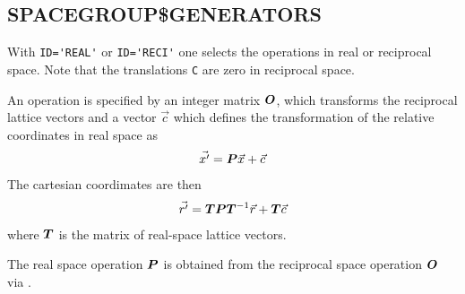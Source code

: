 \documentclass[11pt,a4paper]{report}
\begin{document}
\subsection{SPACEGROUP\$GENERATORS}
With \verb|ID='REAL'| or \verb|ID='RECI'| one selects the operations
in real or reciprocal space. Note that the translations \verb|C| are
zero in reciprocal space.

An operation is specified by an integer matrix $\bm{O}$, which
transforms the reciprocal lattice vectors and a vector $\vec{c}$ which
defines the transformation of the relative coordinates in real space
as
\begin{eqnarray}
\vec{x'}=\bm{P}\vec{x}+\vec{c}
\end{eqnarray}
The cartesian coordimates are then
\begin{eqnarray}
\vec{r'}=\bm{T}\bm{P}\bm{T}^{-1}\vec{r}+\bm{T}\vec{c}
\end{eqnarray}
where $\bm{T}$ is the matrix of real-space lattice vectors.

The real space operation $\bm{P}$ is obtained from the reciprocal
space operation $\bm{O}$ via .



\appendix
\newpage
\end{document}
